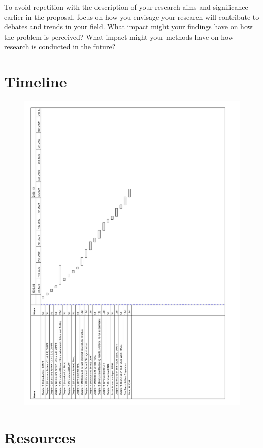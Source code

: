 \documentclass[12pt, a4paper]{article}
\begin{document}
To avoid repetition with the description of your research aims and significance earlier in the proposal, focus on how you envisage your research will contribute to debates and trends in your field. What impact might your findings have on how the problem is perceived? What impact might your methods have on how research is conducted in the future?

\clearpage

\section{Timeline}
\vspace{2cm}
\begin{figure}[h]
	\centering
	\includegraphics[scale=0.62]{./project_plan/project_plan}
\end{figure}

\clearpage

\section{Resources}




\end{document}
